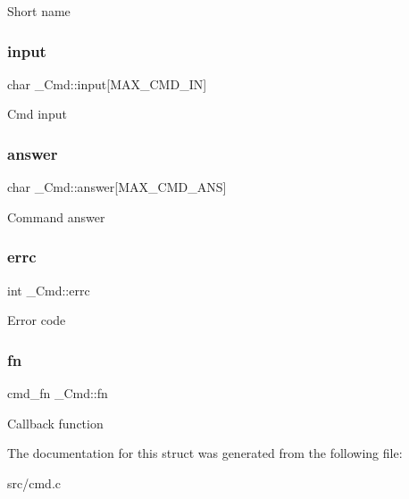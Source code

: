 Short name \mbox{\label{struct__Cmd_a3d023ded28ab2b9ec8daae3ebf1a3759}} 
\subsubsection{\texorpdfstring{input}{input}}
{\footnotesize\ttfamily char \+\_\+\+Cmd\+::input\mbox{[}M\+A\+X\+\_\+\+C\+M\+D\+\_\+\+IN\mbox{]}}

Cmd input \mbox{\label{struct__Cmd_a143c62700ed611e1ff0d70611c76fa55}} 
\subsubsection{\texorpdfstring{answer}{answer}}
{\footnotesize\ttfamily char \+\_\+\+Cmd\+::answer\mbox{[}M\+A\+X\+\_\+\+C\+M\+D\+\_\+\+A\+NS\mbox{]}}

Command answer \mbox{\label{struct__Cmd_a4f3acf8cfdc67548121c1989765cbbcf}} 
\subsubsection{\texorpdfstring{errc}{errc}}
{\footnotesize\ttfamily int \+\_\+\+Cmd\+::errc}

Error code \mbox{\label{struct__Cmd_abfca5a0889206135702ed3e398079bad}} 
\subsubsection{\texorpdfstring{fn}{fn}}
{\footnotesize\ttfamily cmd\+\_\+fn \+\_\+\+Cmd\+::fn}

Callback function 

The documentation for this struct was generated from the following file\+:\begin{DoxyCompactItemize}
\item 
src/cmd.\+c\end{DoxyCompactItemize}
